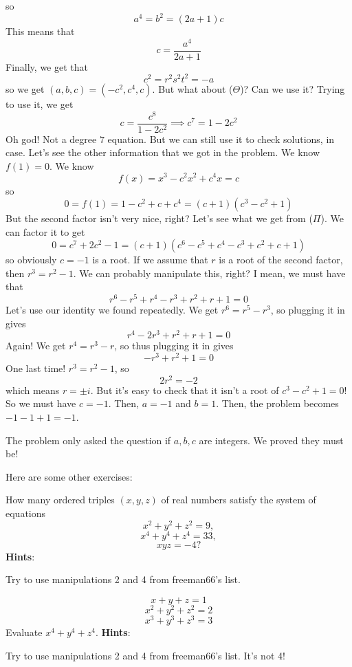 \documentclass[11pt,titlepage]{scrartcl}
\newenvironment{hint}{\footnotesize \normalfont \textbf{Hints}:}{\hspace{-0.5ex}}
\begin{document}
so
\[a^4=b^2=(2a+1)c\]
This means that
\[c=\dfrac{a^4}{2a+1}\tag{$\Theta$}\]
Finally, we get that
\[c^2=r^2s^2t^2=-a\]
so we get $(a,b,c)=(-c^2,c^4,c)$. But what about ($\Theta$)? Can we use it? Trying to use it, we get
\[c=\dfrac{c^8}{1-2c^2}\implies c^7=1-2c^2\tag{$\Pi$}\]
Oh god! Not a degree $7$ equation. But we can still use it to check solutions, in case. Let's see the other information that we got in the problem. We know $f(1)=0$. We know
\[f(x)=x^3-c^2x^2+c^4x=c\]
so
\[0=f(1)=1-c^2+c+c^4=(c+1)(c^3-c^2+1)\]
But the second factor isn't very nice, right? Let's see what we get from ($\Pi$). We can factor it to get
\[0=c^7+2c^2-1=(c+1)(c^6-c^5+c^4-c^3+c^2+c+1)\]
so obviously $c=-1$ is a root. If we assume that $r$ is a root of the second factor, then $r^3=r^2-1$. We can probably manipulate this, right? I mean, we must have that
\[r^6-r^5+r^4-r^3+r^2+r+1=0\]
Let's use our identity we found repeatedly. We get $r^6=r^5-r^3$, so plugging it in gives
\[r^4-2r^3+r^2+r+1=0\]
Again! We get $r^4=r^3-r$, so thus plugging it in gives
\[-r^3+r^2+1=0\]
One last time! $r^3=r^2-1$, so
\[2r^2=-2\]
which means $r=\pm i$. But it's easy to check that it isn't a root of $c^3-c^2+1=0$! So we must have $c=-1$. Then, $a=-1$ and $b=1$. Then, the problem becomes $-1-1+1=\boxed{-1}$.
\begin{remark}
The problem only asked the question if $a,b,c$ are integers. We proved they must be!
\end{remark}
Here are some other exercises:
\begin{exercisebox}
\begin{exercise}
How many ordered triples $(x,y,z)$ of real numbers satisfy the system of equations $$x^2+y^2+z^2=9,$$$$x^4+y^4+z^4=33,$$$$xyz=-4?$$
\begin{hint}
\begin{addhint}{
Try to use manipulations 2 and 4 from freeman66's list.
}\end{addhint}
\end{hint}
\end{exercise}
\begin{exercise}
\[x+y+z=1\]
\[x^2+y^2+z^2=2\]
\[x^3+y^3+z^3=3\]
Evaluate $x^4+y^4+z^4$.
\begin{hint}
\begin{addhint}{
Try to use manipulations 2 and 4 from freeman66's list. It's not 4!
}\end{addhint}
\end{hint}
\end{exercise}
\end{exercisebox}
\end{document}
